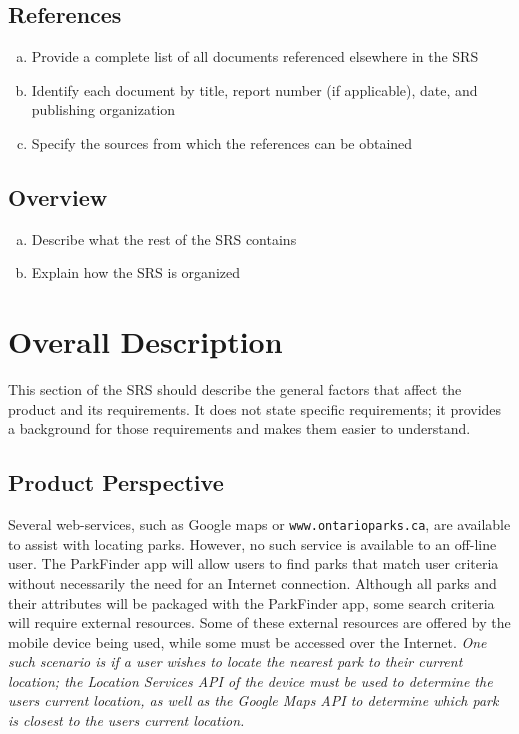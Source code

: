 \documentclass[]{article}
\begin{document}
\subsection{References}%
\label{sub:references}
\begin{enumerate}[a)]
	\item Provide a complete list of all documents referenced elsewhere in the SRS
    \item Identify each document by title, report number (if applicable), date, and publishing
    organization
	\item Specify the sources from which the references can be obtained
\end{enumerate}

\subsection{Overview}%
\label{sub:overview}
\begin{enumerate}[a)]
	\item Describe what the rest of the SRS contains
	\item Explain how the SRS is organized
\end{enumerate}


\section{Overall Description}%
\label{sec:overall_description}
\color{red}
This section of the SRS should describe the general factors that affect the product and its
requirements. It does not state specific requirements; it provides a background for those
requirements and makes them easier to understand.
\color{black}

\subsection{Product Perspective}%
\label{sub:product_perspective}
Several web-services, such as Google maps or \texttt{www.ontarioparks.ca}, are available to
assist with locating parks. However, no such service is available to an off-line user. The
ParkFinder app will allow users to find parks that match user criteria without necessarily the need
for an Internet connection. Although all parks and their attributes will be packaged with the
ParkFinder app, some search criteria will require external resources. Some of these external
resources are offered by the mobile device being used, while some must be accessed over the
Internet. \textit{One such scenario is if a user wishes to locate the nearest park to their current
location; the Location Services API of the device must be used to determine the users current
location, as well as the Google Maps API to determine which park is closest to the users current
location.}
\end{document}
